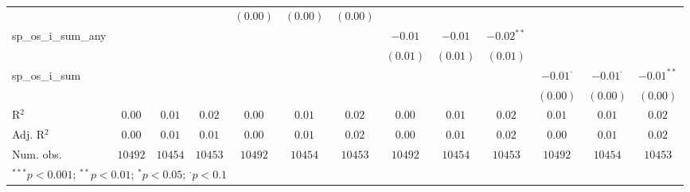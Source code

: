 \begin{sidewaystable}
\begin{center}
{\begin{tabular}{l c c c c c c c c c c c c}
                    &               &                 &                 & $(0.00)$      & $(0.00)$        & $(0.00)$        &               &                 &                &                 &                 &                 \\
sp\_os\_i\_sum\_any &               &                 &                 &               &                 &                 & $-0.01$       & $-0.01$         & $-0.02^{**}$   &                 &                 &                 \\
                    &               &                 &                 &               &                 &                 & $(0.01)$      & $(0.01)$        & $(0.01)$       &                 &                 &                 \\
sp\_os\_i\_sum      &               &                 &                 &               &                 &                 &               &                 &                & $-0.01^{\cdot}$ & $-0.01^{\cdot}$ & $-0.01^{**}$    \\
                    &               &                 &                 &               &                 &                 &               &                 &                & $(0.00)$        & $(0.00)$        & $(0.00)$        \\
\hline
R$^2$               & $0.00$        & $0.01$          & $0.02$          & $0.00$        & $0.01$          & $0.02$          & $0.00$        & $0.01$          & $0.02$         & $0.01$          & $0.01$          & $0.02$          \\
Adj. R$^2$          & $0.00$        & $0.01$          & $0.01$          & $0.00$        & $0.01$          & $0.02$          & $0.00$        & $0.01$          & $0.02$         & $0.00$          & $0.01$          & $0.02$          \\
Num. obs.           & $10492$       & $10454$         & $10453$         & $10492$       & $10454$         & $10453$         & $10492$       & $10454$         & $10453$        & $10492$         & $10454$         & $10453$         \\
\hline
\multicolumn{13}{l}{\scriptsize{$^{***}p<0.001$; $^{**}p<0.01$; $^{*}p<0.05$; $^{\cdot}p<0.1$}}
\end{tabular}
}
\caption{}
\label{table:coefficients}
\end{center}
\end{sidewaystable}

